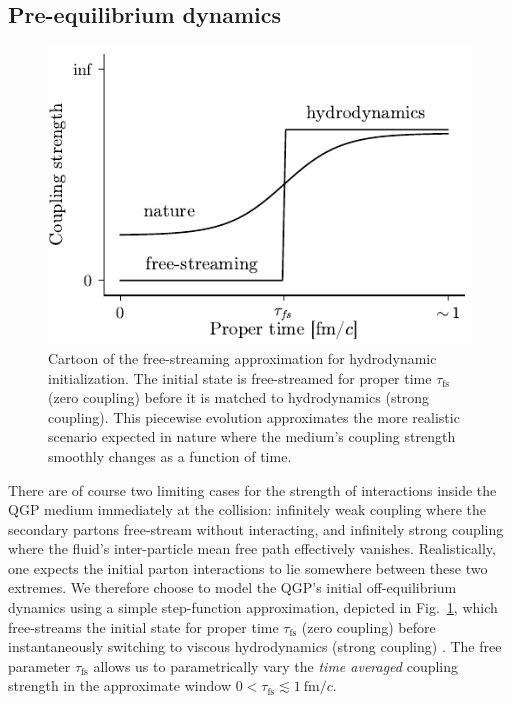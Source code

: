 \documentclass[aps,prc,reprint,amsmath,nofootinbib]{revtex4-1}
\newcommand{\fmc}{\ensuremath{\text{fm}/c}}
\newcommand{\taufs}{\tau_\text{fs}}
\begin{document}
\subsection{Pre-equilibrium dynamics}

\begin{figure}[b]
  \includegraphics{coupling}
  \caption{Cartoon of the free-streaming approximation for hydrodynamic initialization. The initial state is free-streamed for proper time $\taufs$ (zero coupling) before it is matched to hydrodynamics (strong coupling). This piecewise evolution approximates the more realistic scenario expected in nature where the medium's coupling strength smoothly changes as a function of time.}
  \label{fig:coupling}
\end{figure}

There are of course two limiting cases for the strength of interactions inside the QGP medium immediately at the collision: infinitely weak coupling where the secondary partons free-stream without interacting, and infinitely strong coupling where the fluid's inter-particle mean free path effectively vanishes.
Realistically, one expects the initial parton interactions to lie somewhere between these two extremes.
We therefore choose to model the QGP's initial off-equilibrium dynamics using a simple step-function approximation, depicted in Fig.~\ref{fig:coupling}, which free-streams the initial state for proper time $\taufs$ (zero coupling) before instantaneously switching to viscous hydrodynamics (strong coupling) \cite{Liu:2015nwa, Broniowski:2008qk}.
The free parameter $\taufs$ allows us to parametrically vary the \emph{time averaged} coupling strength in the approximate window $0 < \taufs \lesssim1\ \fmc$.
\end{document}
